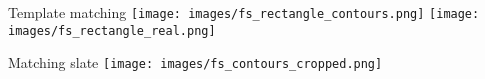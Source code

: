 \begin{frame}{Template matching}
    \centering
    \texttt{[image: images/fs\_rectangle\_contours.png]}
    \texttt{[image: images/fs\_rectangle\_real.png]}
\end{frame}

\begin{frame}{Matching slate}
    \centering
    \texttt{[image: images/fs\_contours\_cropped.png]}
\end{frame}




